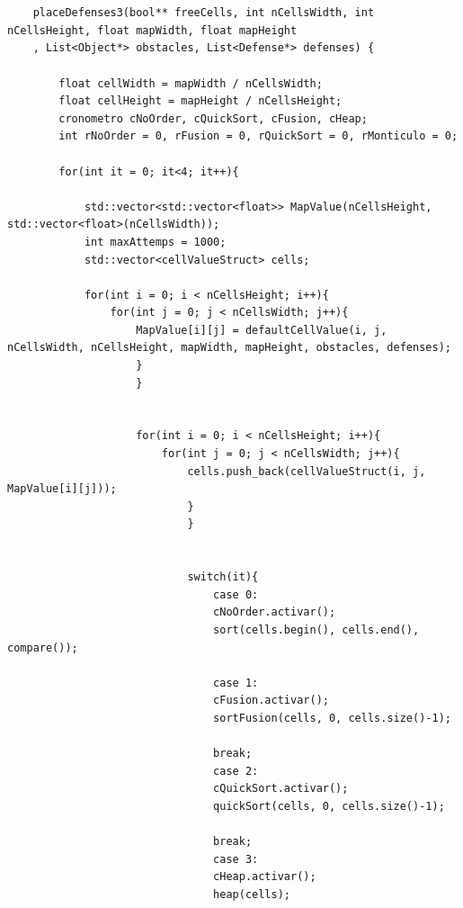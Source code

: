 \begin{lstlisting}
    
    
    placeDefenses3(bool** freeCells, int nCellsWidth, int nCellsHeight, float mapWidth, float mapHeight
    , List<Object*> obstacles, List<Defense*> defenses) {
        
        float cellWidth = mapWidth / nCellsWidth;
        float cellHeight = mapHeight / nCellsHeight; 
        cronometro cNoOrder, cQuickSort, cFusion, cHeap;
        int rNoOrder = 0, rFusion = 0, rQuickSort = 0, rMonticulo = 0; 
        
        for(int it = 0; it<4; it++){
            
            std::vector<std::vector<float>> MapValue(nCellsHeight, std::vector<float>(nCellsWidth));
            int maxAttemps = 1000;
            std::vector<cellValueStruct> cells;
            
            for(int i = 0; i < nCellsHeight; i++){
                for(int j = 0; j < nCellsWidth; j++){
                    MapValue[i][j] = defaultCellValue(i, j, nCellsWidth, nCellsHeight, mapWidth, mapHeight, obstacles, defenses);
                    }
                    }
                    
                    
                    for(int i = 0; i < nCellsHeight; i++){
                        for(int j = 0; j < nCellsWidth; j++){
                            cells.push_back(cellValueStruct(i, j, MapValue[i][j]));
                            }
                            }
                            
                            
                            switch(it){
                                case 0:
                                cNoOrder.activar();
                                sort(cells.begin(), cells.end(), compare());
                                
                                case 1: 
                                cFusion.activar();
                                sortFusion(cells, 0, cells.size()-1); 
                                
                                break;
                                case 2:   
                                cQuickSort.activar();
                                quickSort(cells, 0, cells.size()-1); 
                                
                                break;
                                case 3: 
                                cHeap.activar();
                                heap(cells); 
                                

\end{lstlisting}
